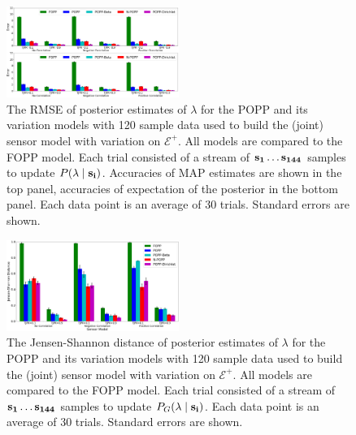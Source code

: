\begin{figure}[t!]
	\centering
	\includegraphics[width=0.5\textwidth]{./figures/tjpr_comparison_120.png}
    \caption{The RMSE of posterior estimates of $\lambda$ for the POPP and its variation models with 120 sample data used to build the (joint) sensor model with variation on $\mathcal{E^+}$. All models are compared to the FOPP model. Each trial consisted of a stream of $\protect\mathbf{s_1} \ldots \protect\mathbf{s_{144}}$ samples to update $P(\lambda \mid \protect\mathbf{s_i})$. Accuracies of MAP estimates are shown in the top panel, accuracies of expectation of the posterior in the bottom panel. Each data point is an average of 30 trials. Standard errors are shown.} 
	\label{fig:tjpr_comparison_120}
\end{figure}

\begin{figure}[t!]
	\centering
	\includegraphics[width=0.5\textwidth]{./figures/tjpr_comparison_120_kl.png}
	\caption{The Jensen-Shannon distance of posterior estimates of $\lambda$ for the POPP and its variation models with 120 sample data used to build the (joint) sensor model with variation on $\mathcal{E^+}$. All models are compared to the FOPP model. Each trial consisted of a stream of $\protect\mathbf{s_1} \ldots \protect\mathbf{s_{144}}$ samples to update $P_G(\lambda \mid \protect\mathbf{s_i})$. Each data point is an average of 30 trials. Standard errors are shown.} 
	\label{fig:tjpr_comparison_120_kl}
\end{figure}


